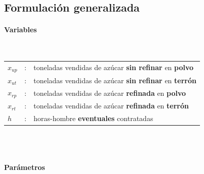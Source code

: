 \subsection{Formulación generalizada}

\paragraph{Variables}\mbox{}\\

\begin{tabular}{l c l}
    $x_{up}$  & : & toneladas vendidas de azúcar \textbf{sin refinar} en \textbf{polvo} \\
    $x_{ut}$  & : & toneladas vendidas de azúcar \textbf{sin refinar} en \textbf{terrón} \\
    $x_{rp}$  & : & toneladas vendidas de azúcar \textbf{refinada} en \textbf{polvo} \\
    $x_{rt}$  & : & toneladas vendidas de azúcar \textbf{refinada} en \textbf{terrón} \\
    $h$       & : & horas-hombre \textbf{eventuales} contratadas \\
\end{tabular}
\\
\\

\paragraph{Parámetros}\mbox{}\\

